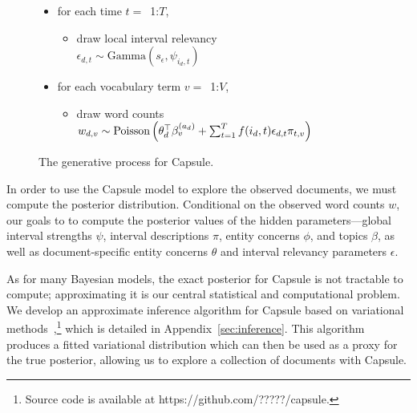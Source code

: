 \begin{figure}[htb]
\begin{mdframed}
\begin{itemize}[leftmargin=*]
\begin{itemize}[leftmargin=*]
\begin{itemize}[leftmargin=*]
		\end{itemize}
	\item for each time $t=$~1:$T$,
		\begin{itemize}[leftmargin=*]
			\item draw local interval relevancy \\$\epsilon_{d,t} \sim \mbox{Gamma}(s_\epsilon, \psi_{i_d,t})$ 
		\end{itemize}
	\item for each vocabulary term $v=$~1:$V$,
		\begin{itemize}[leftmargin=*]
			\item draw word counts $w_{d,v} \sim \\ \mbox{Poisson}\left(\theta_d^\top\beta^{(a_d)}_v + \sum_{t=1}^T f(i_d, t) \epsilon_{d,t} \pi_{t,v}\right)$
		\end{itemize}
	\end{itemize}
\end{itemize}
\end{mdframed}
\caption{The generative process for Capsule.}
\label{fig:generative-model}
\end{figure}



In order to use the Capsule model to explore the observed documents, we must compute the posterior distribution.  Conditional on the observed word counts $w$, our goals to to compute the posterior values of the hidden parameters---global interval strengths $\psi$, interval descriptions $\pi$, entity concerns $\phi$, and topics $\beta$, as well as document-specific entity concerns $\theta$ and interval relevancy parameters $\epsilon$.

As for many Bayesian models, the exact posterior for Capsule is not tractable to compute; approximating it is our central statistical and computational problem.  We develop an approximate inference algorithm for Capsule based on variational methods~\cite{Wainwright:2008},\footnote{Source code is available at https://github.com/?????/capsule.} which is detailed in Appendix~\ref{sec:inference}. This algorithm produces a fitted variational distribution which can then be used as a proxy for the true posterior, allowing us to explore a collection of documents with Capsule.  



